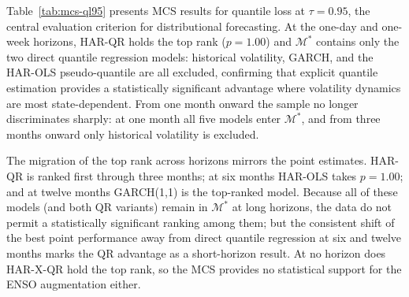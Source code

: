 Table~\ref{tab:mcs-ql95} presents MCS results for quantile loss at
$\tau = 0.95$, the central evaluation criterion for distributional
forecasting. At the one-day and one-week horizons, HAR-QR holds the top
rank ($p = 1.00$) and $\mathcal{M}^{*}$ contains only the two direct
quantile regression models: historical volatility, GARCH, and the HAR-OLS
pseudo-quantile are all excluded, confirming that explicit quantile
estimation provides a statistically significant advantage where
volatility dynamics are most state-dependent. From one month onward the
sample no longer discriminates sharply: at one month all five models
enter $\mathcal{M}^{*}$, and from three months onward only historical
volatility is excluded.

The migration of the top rank across horizons mirrors the point
estimates. HAR-QR is ranked first through three months; at six months
HAR-OLS takes $p = 1.00$; and at twelve months GARCH(1,1) is the
top-ranked model. Because all of these models (and both QR variants)
remain in $\mathcal{M}^{*}$ at long horizons, the data do not permit a
statistically significant ranking among them; but the consistent shift of
the best point performance away from direct quantile regression at six
and twelve months marks the QR advantage as a short-horizon result. At no
horizon does HAR-X-QR hold the top rank, so the MCS provides no
statistical support for the ENSO augmentation either.

